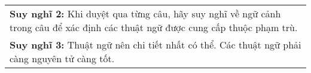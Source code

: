 \begin{table}[ht]
{\begin{tabular}{p{}}
            \textbf{Suy nghĩ 2:} Khi duyệt qua từng câu, hãy suy nghĩ về ngữ cảnh trong câu để xác định các thuật ngữ được cung cấp thuộc phạm trù.                                                                                                                                                                                                                                                                                                                                                                                                                                                                                                        \\
            \textbf{Suy nghĩ 3:} Thuật ngữ nên chi tiết nhất có thể. Các thuật ngữ phải càng nguyên tử càng tốt.                                                                                                                                                                                                                                                                                                                                                                                                                                                                                                                                           \\
            \bottomrule
        \end{tabular}}
\end{table}

